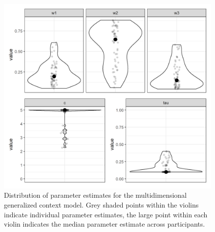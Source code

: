 \documentclass[a4paper,man,natbib]{apa6}
\begin{document}
\begin{figure}
\centering
\includegraphics[width = \textwidth]{fig_par_multidim.png}
\caption{Distribution of parameter estimates for the multidimensional generalized context model. Grey shaded points within the violins indicate individual parameter estimates, the large point within each violin indicates the median parameter estimate across participants.}
\label{fig:par_multidim}
\end{figure}
\end{document}

